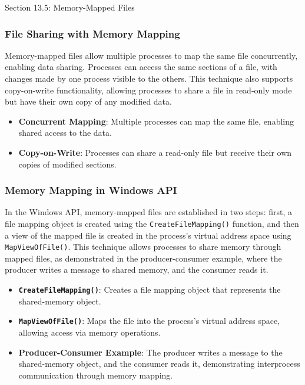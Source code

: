 \begin{notes}{Section 13.5: Memory-Mapped Files}
    \subsubsection*{File Sharing with Memory Mapping}
    
    Memory-mapped files allow multiple processes to map the same file concurrently, enabling data sharing. Processes can access the same sections of a file, with changes made by one process visible to the others. This technique also supports copy-on-write functionality, allowing processes to share a file in read-only mode but have their own copy of any modified data.
    
    \begin{highlight}
    
        \begin{itemize}
            \item \textbf{Concurrent Mapping}: Multiple processes can map the same file, enabling shared access to the data.
            \item \textbf{Copy-on-Write}: Processes can share a read-only file but receive their own copies of modified sections.
        \end{itemize}
    
    \end{highlight}
    
    \subsubsection*{Memory Mapping in Windows API}
    
    In the Windows API, memory-mapped files are established in two steps: first, a file mapping object is created using the \texttt{CreateFileMapping()} function, and then a view of the mapped file is created in the process's virtual address space using \texttt{MapViewOfFile()}. This technique allows processes to share memory through mapped files, as demonstrated in the producer-consumer example, where the producer writes a message to shared memory, and the consumer reads it.
    
    \begin{highlight}
    
        \begin{itemize}
            \item \textbf{\texttt{CreateFileMapping()}}: Creates a file mapping object that represents the shared-memory object.
            \item \textbf{\texttt{MapViewOfFile()}}: Maps the file into the process's virtual address space, allowing access via memory operations.
            \item \textbf{Producer-Consumer Example}: The producer writes a message to the shared-memory object, and the consumer reads it, demonstrating interprocess communication through memory mapping.
        \end{itemize}
    

\end{highlight}
\end{notes}
